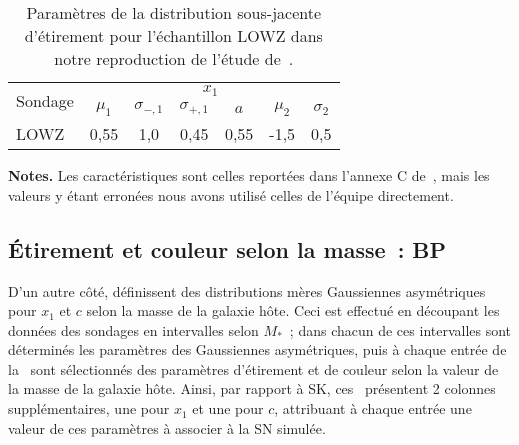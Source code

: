 \documentclass[../main/main.tex]{subfiles}
\begin{document}
\begin{table}[ht]
    \centering
    \begin{threeparttable}
        \caption[Paramètres de la distribution d'étirement pour l'échantillon
        LOWZ des simulations SK]{Paramètres de la distribution sous-jacente
            d'étirement pour l'échantillon LOWZ dans notre reproduction de
        l'étude de~.}
        \label{tab:sklowz}
        \begin{tabular}{lcccccc}
            \toprule
            \multirow{2}[2]{*}{Sondage} &
            \multicolumn{6}{c}{$x_1$}\\
            \cmidrule(lr){2-7} &
            $\mu_1$ & $\sigma_{-,1}$ & $\sigma_{+,1}$ &
            $a$ &
            $\mu_2$ & $\sigma_{2}$ \\
            \midrule
            LOWZ &
            0,55 & 1,0 & 0,45  &
            0,55 &
            -1,5 & 0,5 \\
            \bottomrule
        \end{tabular}
        \begin{tablenotes}[flushleft]
        \item\small \textbf{\hspace{-3,2pt}Notes.} Les caractéristiques sont
            celles reportées dans l'annexe C de~\cite{scolnic2018}, mais les
            valeurs y étant erronées nous avons utilisé celles de l'équipe
            directement.
        \end{tablenotes}
    \end{threeparttable}
\end{table}

\subsection{Étirement et couleur selon la masse~: BP}\label{ssec:bp}

D'un autre côté,  définissent des distributions mères
Gaussiennes asymétriques pour $x_1$ et $c$ selon la masse de la galaxie hôte.
Ceci est effectué en découpant les données des sondages en intervalles selon
$M_*$~; dans chacun de ces intervalles sont déterminés les paramètres des
Gaussiennes asymétriques, puis à chaque entrée de la \hostlib\ sont sélectionnés
des paramètres d'étirement et de couleur selon la valeur de la masse de la
galaxie hôte. Ainsi, par rapport à SK, ces \hostlib\ présentent 2 colonnes
supplémentaires, une pour $x_1$ et une pour $c$, attribuant à chaque entrée une
valeur de ces paramètres à associer à la SN simulée. 
\end{document}
